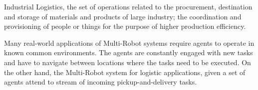 \begin{mydef}
    Industrial Logistics, the set of operations related to the procurement,
    destination and storage of materials and products of large industry; the coordination and provisioning of people or things for the purpose of higher production efficiency.
\end{mydef}

Many real-world applications of Multi-Robot systems require agents to operate
in known common environments. The agents are constantly engaged with new tasks and have
to navigate between locations where the tasks need to be executed. On the other hand,
the Multi-Robot system for logistic applications, given a set of agents attend 
to stream of incoming pickup-and-delivery tasks.







